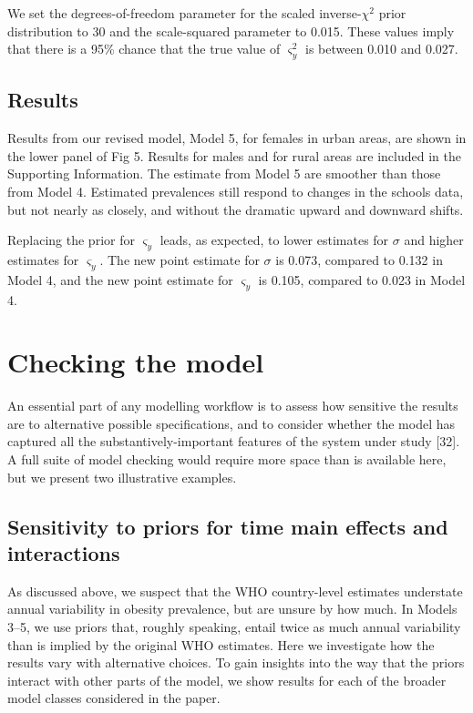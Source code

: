 \documentclass[10pt,letterpaper]{article}
\begin{document}
We set the degrees-of-freedom parameter for the scaled
inverse-\(\chi^2\) prior distribution to 30 and the scale-squared
parameter to 0.015. These values imply that there is a 95\% chance that
the true value of \(\varsigma_y^2\) is between 0.010 and 0.027.

\hypertarget{results-4}{%
\subsection{Results}\label{results-4}}

Results from our revised model, Model 5, for females in urban areas, are
shown in the lower panel of Fig 5. Results for males and for rural areas
are included in the Supporting Information. The estimate from Model 5
are smoother than those from Model 4. Estimated prevalences still
respond to changes in the schools data, but not nearly as closely, and
without the dramatic upward and downward shifts.

Replacing the prior for \(\varsigma_y\) leads, as expected, to lower
estimates for \(\sigma\) and higher estimates for \(\varsigma_y\). The
new point estimate for \(\sigma\) is 0.073, compared to 0.132 in Model
4, and the new point estimate for \(\varsigma_y\) is 0.105, compared to
0.023 in Model 4.

\hypertarget{checking-the-model}{%
\section{Checking the model}\label{checking-the-model}}

An essential part of any modelling workflow is to assess how sensitive
the results are to alternative possible specifications, and to consider
whether the model has captured all the substantively-important features
of the system under study {[}32{]}. A full suite of model checking would
require more space than is available here, but we present two
illustrative examples.

\hypertarget{subsec:sensitivity}{%
\subsection{Sensitivity to priors for time main effects and
interactions}\label{subsec:sensitivity}}

As discussed above, we suspect that the WHO country-level estimates
understate annual variability in obesity prevalence, but are unsure by
how much. In Models 3--5, we use priors that, roughly speaking, entail
twice as much annual variability than is implied by the original WHO
estimates. Here we investigate how the results vary with alternative
choices. To gain insights into the way that the priors interact with
other parts of the model, we show results for each of the broader model
classes considered in the paper.
\end{document}

